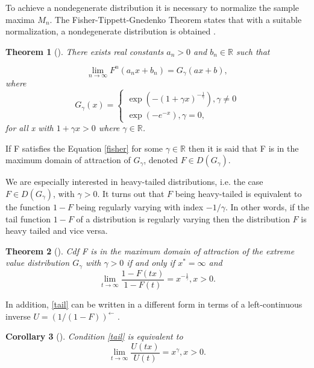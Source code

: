 \documentclass[english,12pt,a4paper,pdftex,sci,utf8]{aaltothesis} %
\newtheorem{theorem}{Theorem}[section]
\newtheorem{corollary}[theorem]{Corollary}
\begin{document}
To achieve a nondegenerate distribution it is necessary to normalize the sample maxima $M_n$. The Fisher-Tippett-Gnedenko Theorem states that with a suitable normalization, a nondegenerate distribution is obtained \cite{fisher} \cite{gnedenko}.

\begin{theorem}[{\cite[Theorem 1.1.6]{deHaan}}]
There exists real constants $a_n>0$ and $b_n \in \mathbb{R}$ such that 

\begin{equation}
\lim_{n\to\infty} F^n(a_nx + b_n) = G_{\gamma}(ax+b),
\label{fisher}
\end{equation}
where
\begin{equation*}
G_{\gamma}(x)=
\begin{cases}
\exp(-(1 + \gamma x)^{-\frac{1}{\gamma}}), \gamma \neq 0 \\
\exp(-e^{-x}), \gamma = 0,
\end{cases}
\label{mdaEq}
\end{equation*}
for all x with $1+\gamma x > 0$ where $\gamma \in \mathbb{R}$.
\end{theorem}
If F satisfies the Equation \eqref{fisher} for some $\gamma \in \mathbb{R}$ then it is said that F is in the maximum domain of attraction of $G_{\gamma}$, denoted $F \in D(G_{\gamma})$.

We are especially interested in heavy-tailed distributions, i.e. the case $F \in D(G_{\gamma})$, with $\gamma>0$. It turns out that $F$ being heavy-tailed is equivalent to the function $1-F$ being regularly varying with index $-1/ \gamma$. In other words, if the tail function $1-F$ of a distribution is regularly varying then the distribution $F$ is heavy tailed and vice versa. \cite{deHaan}

\begin{theorem}[{\cite[Theorem 1.2.1]{deHaan}}]
Cdf F is in the maximum domain of attraction of the extreme value distribution $G_{\gamma}$ with $\gamma>0$ if and only if $x^*=\infty$ and
\begin{equation}
\lim_{t\rightarrow \infty} \frac{1-F(tx)}{1-F(t)} = x^{-\frac{1}{\gamma}}, x>0.
\label{tail}
\end{equation}
\end{theorem}

In addition, \eqref{tail} can be written in a different form in terms of a left-continuous inverse $U=(1/(1-F))^{\leftarrow}$ \cite{deHaan}.

\begin{corollary}[{\cite[Corollary 1.2.10]{deHaan}}]
Condition \eqref{tail} is equivalent to
\begin{equation}
\lim_{t \rightarrow \infty} \frac{U(tx)}{U(t)} = x^{\gamma}, x>0.
\label{Utail}
\end{equation}
\end{corollary}
\end{document}

